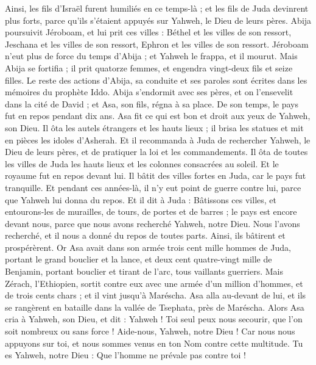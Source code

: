 \begin{multicols}{2}
Ainsi, les fils d’Israël furent humiliés en ce temps-là ; et les fils de Juda devinrent plus forts, parce qu'ils s'étaient appuyés sur Yahweh, le Dieu de leurs pères.
 Abija poursuivit Jéroboam, et lui prit ces villes : Béthel et les villes de son ressort, Jeschana et les villes de son ressort, Ephron et les villes de son ressort.
Jéroboam n'eut plus de force du temps d'Abija ; et Yahweh le frappa, et il mourut.
Mais Abija se fortifia ; il prit quatorze femmes, et engendra vingt-deux fils et seize filles.
Le reste des actions d'Abija, sa conduite et ses paroles sont écrites dans les mémoires du prophète Iddo.
\VerseOne{}Abija s'endormit avec ses pères, et on l'ensevelit dans la cité de David ; et Asa, son fils, régna à sa place. De son temps, le pays fut en repos pendant dix ans.
Asa fit ce qui est bon et droit aux yeux de Yahweh, son Dieu.
Il ôta les autels étrangers et les hauts lieux ; il brisa les statues et mit en pièces les idoles d'Asherah.
Et il recommanda à Juda de rechercher Yahweh, le Dieu de leurs pères, et de pratiquer la loi et les commandements.
Il ôta de toutes les villes de Juda les hauts lieux et les colonnes consacrées au soleil. Et le royaume fut en repos devant lui.
Il bâtit des villes fortes en Juda, car le pays fut tranquille. Et pendant ces années-là, il n'y eut point de guerre contre lui, parce que Yahweh lui donna du repos.
Et il dit à Juda : Bâtissons ces villes, et entourons-les de murailles, de tours, de portes et de barres ; le pays est encore devant nous, parce que nous avons recherché Yahweh, notre Dieu. Nous l'avons recherché, et il nous a donné du repos de toutes parts. Ainsi, ils bâtirent et prospérèrent.
Or Asa avait dans son armée trois cent mille hommes de Juda, portant le grand bouclier et la lance, et deux cent quatre-vingt mille de Benjamin, portant bouclier et tirant de l'arc, tous vaillants guerriers.
Mais Zérach, l'Ethiopien, sortit contre eux avec une armée d'un million d'hommes, et de trois cents chars ; et il vint jusqu'à Maréscha.
Asa alla au-devant de lui, et ils se rangèrent en bataille dans la vallée de Tsephata, près de Maréscha.
Alors Asa cria à Yahweh, son Dieu, et dit : Yahweh ! Toi seul peux nous secourir, que l'on soit nombreux ou sans force ! Aide-nous, Yahweh, notre Dieu ! Car nous nous appuyons sur toi, et nous sommes venus en ton Nom contre cette multitude. Tu es Yahweh, notre Dieu : Que l'homme ne prévale pas contre toi !

\end{multicols}
